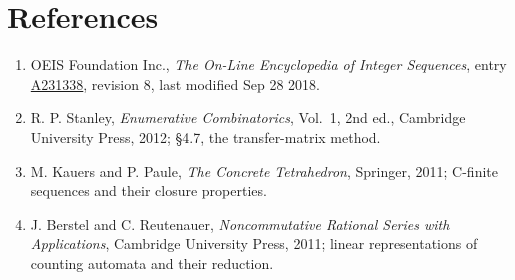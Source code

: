 \documentclass[11pt]{article}
\theoremstyle{definition}
\begin{document}
\section{References}

\begin{enumerate}

\item OEIS Foundation Inc., \emph{The On-Line Encyclopedia of Integer Sequences}, entry \href{https://oeis.org/A231338}{A231338}, revision 8, last modified Sep 28 2018.

\item R. P. Stanley, \emph{Enumerative Combinatorics}, Vol.~1, 2nd ed., Cambridge University Press, 2012; \S4.7, the transfer-matrix method.

\item M. Kauers and P. Paule, \emph{The Concrete Tetrahedron}, Springer, 2011; C-finite sequences and their closure properties.

\item J. Berstel and C. Reutenauer, \emph{Noncommutative Rational Series with Applications}, Cambridge University Press, 2011; linear representations of counting automata and their reduction.

\end{enumerate}
\end{document}
